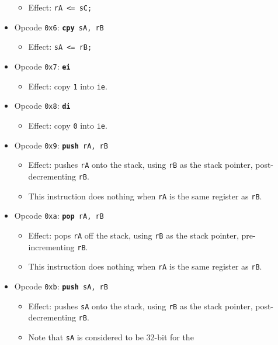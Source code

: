 \documentclass{article}
\begin{document}
\begin{itemize}
\begin{itemize}
		\item Effect: \texttt{rA <= sC;}
		\end{itemize}
	\item Opcode \texttt{0x6}:
		\texttt{\textbf{cpy} sA, rB}
		\begin{itemize}
		\item Effect: \texttt{sA <= rB;}
		\end{itemize}
	\item Opcode \texttt{0x7}:
		\texttt{\textbf{ei}}
		\begin{itemize}
		\item Effect: copy \texttt{1} into \texttt{ie}.
		\end{itemize}
	\item Opcode \texttt{0x8}:
		\texttt{\textbf{di}}
		\begin{itemize}
		\item Effect: copy \texttt{0} into \texttt{ie}.
		\end{itemize}
	\item Opcode \texttt{0x9}:
		\texttt{\textbf{push} rA, rB}
		\begin{itemize}
		\item Effect: pushes \texttt{rA} onto the stack, using
		\texttt{rB} as the stack pointer, post-decrementing
		\texttt{rB}.
		\item This instruction does nothing when \texttt{rA} is the
		same register as \texttt{rB}. 
		\end{itemize}
	\item Opcode \texttt{0xa}:
		\texttt{\textbf{pop} rA, rB}
		\begin{itemize}
		\item Effect: pops \texttt{rA} off the stack, using
		\texttt{rB} as the stack pointer, pre-incrementing \texttt{rB}.
		\item This instruction does nothing when \texttt{rA} is the
		same register as \texttt{rB}. 
		\end{itemize}
	\item Opcode \texttt{0xb}:
		\texttt{\textbf{push} sA, rB}
		\begin{itemize}
		\item Effect: pushes \texttt{sA} onto the stack, using
		\texttt{rB} as the stack pointer, post-decrementing
		\texttt{rB}.
		\item Note that \texttt{sA} is considered to be 32-bit for the

\end{itemize}
\end{itemize}
\end{document}
